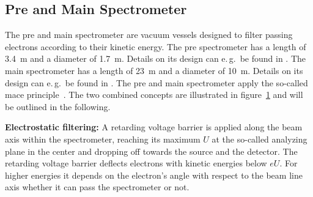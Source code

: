 \subsection{Pre and Main Spectrometer}
\label{sec:katrinExpSetupSpectrometer}
\begin{figure}[t]
	\label{fig:katrinExpSetupSpectrometer}
\end{figure}
The pre and main spectrometer are vacuum vessels designed to filter passing electrons according to their kinetic energy. The pre spectrometer has a length of \SI{3.4}{m} and a diameter of \SI{1.7}{m}. Details on its design can e.\,g.~be found in \cite{Prall2012}. The main spectrometer has a length of \SI{23}{m} and a diameter of \SI{10}{m}. Details on its design can e.\,g.~be found in \cite{Valerius2009}. The pre and main spectrometer apply the so-called \gls{mace} principle~\cite{Angrik:2005ep}. The two combined concepts are illustrated in figure~\ref{fig:katrinExpSetupSpectrometer} and will be outlined in the following.

{\par \textbf{Electrostatic filtering:}
A retarding voltage barrier is applied along the beam axis within the spectrometer, reaching its maximum $U$ at the so-called analyzing plane in the center and dropping off towards the source and the detector. The retarding voltage barrier deflects electrons with kinetic energies below $eU$. For higher energies it depends on the electron's angle with respect to the beam line axis whether it can pass the spectrometer or not. }

